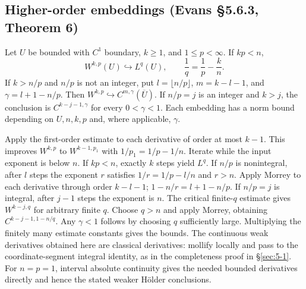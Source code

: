 \subsection{Higher-order embeddings (Evans \S5.6.3, Theorem 6)}
Let $U$ be bounded with $C^1$ boundary, $k\geq1$, and $1\leq p<\infty$.
If $kp<n$,
\[
 W^{k,p}(U)\hookrightarrow L^q(U),\qquad
 \frac1q=\frac1p-\frac{k}{n}.
\]
If $k>n/p$ and $n/p$ is not an integer, put
$l=\lfloor n/p\rfloor$, $m=k-l-1$, and $\gamma=l+1-n/p$.
Then $W^{k,p}\hookrightarrow C^{m,\gamma}(\overline U)$.
If $n/p=j$ is an integer and $k>j$, the conclusion is
$C^{k-j-1,\gamma}$ for every $0<\gamma<1$.
Each embedding has a norm bound depending on $U,n,k,p$ and, where
applicable, $\gamma$.
\begin{expandedproof}
Apply the first-order estimate to each derivative of order at most $k-1$.
This improves $W^{k,p}$ to $W^{k-1,p_1}$ with
$1/p_1=1/p-1/n$. Iterate while the input exponent is below $n$.
If $kp<n$, exactly $k$ steps yield $L^q$.
If $n/p$ is nonintegral, after $l$ steps the exponent $r$ satisfies
$1/r=1/p-l/n$ and $r>n$. Apply Morrey to each derivative through
order $k-l-1$; $1-n/r=l+1-n/p$.
If $n/p=j$ is integral, after $j-1$ steps the exponent is $n$.
The critical finite-$q$ estimate gives $W^{k-j,q}$ for arbitrary finite
$q$. Choose $q>n$ and apply Morrey, obtaining
$C^{k-j-1,1-n/q}$. Any $\gamma<1$ follows by choosing $q$ sufficiently
large. Multiplying the finitely many estimate constants gives the bounds.
The continuous weak derivatives obtained here are classical derivatives:
mollify locally and pass to the coordinate-segment integral identity,
as in the completeness proof in \S\ref{sec:5-1}.
For $n=p=1$, interval absolute continuity gives the needed bounded
derivatives directly and hence the stated weaker H\"older conclusions.
\end{expandedproof}
\Needspace{45mm}
